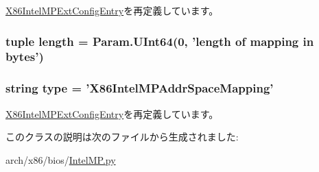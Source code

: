 \hyperlink{classIntelMP_1_1X86IntelMPExtConfigEntry_a17da7064bc5c518791f0c891eff05fda}{X86IntelMPExtConfigEntry}を再定義しています。\hypertarget{classIntelMP_1_1X86IntelMPAddrSpaceMapping_a8c426fb385e90544414050b427d7426d}{
\subsubsection[{length}]{\setlength{\rightskip}{0pt plus 5cm}tuple {\bf length} = Param.UInt64(0, '{\bf length} of mapping in bytes')}}
\label{classIntelMP_1_1X86IntelMPAddrSpaceMapping_a8c426fb385e90544414050b427d7426d}
\hypertarget{classIntelMP_1_1X86IntelMPAddrSpaceMapping_acce15679d830831b0bbe8ebc2a60b2ca}{
\subsubsection[{type}]{\setlength{\rightskip}{0pt plus 5cm}string {\bf type} = '{\bf X86IntelMPAddrSpaceMapping}'}}
\label{classIntelMP_1_1X86IntelMPAddrSpaceMapping_acce15679d830831b0bbe8ebc2a60b2ca}


\hyperlink{classIntelMP_1_1X86IntelMPExtConfigEntry_acce15679d830831b0bbe8ebc2a60b2ca}{X86IntelMPExtConfigEntry}を再定義しています。

このクラスの説明は次のファイルから生成されました:\begin{DoxyCompactItemize}
\item 
arch/x86/bios/\hyperlink{IntelMP_8py}{IntelMP.py}\end{DoxyCompactItemize}
